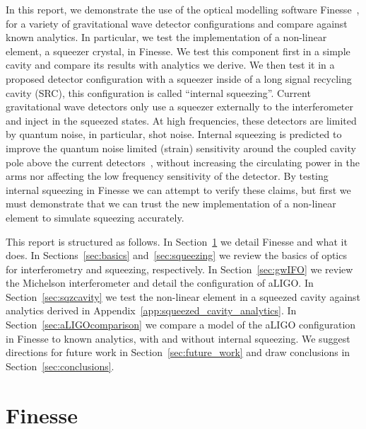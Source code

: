 \documentclass[aps,pra,superscriptaddress,reprint,nofootinbib]{revtex4-1}
\begin{document}
In this report, we demonstrate the use of the optical modelling software Finesse~\cite{finesse}, for a variety of gravitational wave detector configurations and compare against known analytics. In particular, we test the implementation of a non-linear element, a squeezer crystal, in Finesse.
We test this component first in a simple cavity and compare its results with analytics we derive. We then test it in a proposed detector configuration with a squeezer inside of a long signal recycling cavity (SRC), this configuration is called ``internal squeezing''.
Current gravitational wave detectors only use a squeezer externally to the interferometer and inject in the squeezed states.
At high frequencies, these detectors are limited by quantum noise, in particular, shot noise. Internal squeezing is predicted to improve the quantum noise limited (strain) sensitivity around the coupled cavity pole above the current detectors~\cite{Korobko_2019,Adya_2020}, without increasing the circulating power in the arms nor affecting the low frequency sensitivity of the detector.
By testing internal squeezing in Finesse we can attempt to verify these claims, but first we must demonstrate that we can trust the new implementation of a non-linear element to simulate squeezing accurately.


This report is structured as follows.
In Section~\ref{sec:Finesse} we detail Finesse and what it does.
In Sections~\ref{sec:basics} and~\ref{sec:squeezing} we review the basics of optics for interferometry and squeezing, respectively. In Section~\ref{sec:gwIFO} we review the Michelson interferometer and detail the configuration of aLIGO.
In Section~\ref{sec:sqzcavity} we test the non-linear element in a squeezed cavity against analytics derived in Appendix~\ref{app:squeezed_cavity_analytics}. 
In Section~\ref{sec:aLIGOcomparison} we compare a model of the aLIGO configuration in Finesse to known analytics, with and without internal squeezing.
We suggest directions for future work in Section~\ref{sec:future_work} and draw conclusions in Section~\ref{sec:conclusions}.


\section{Finesse} %
\label{sec:Finesse}
\end{document}
